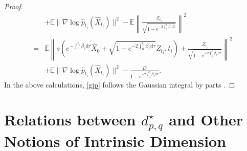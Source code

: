 \documentclass[12pts]{article}
\newcommand{\diff}{\mathrm{d}}
\newcommand{\hX}{ \widehat{X}}
\newcommand{\E}{\mathbb{E}}
\newcommand{\hp}{\hat{p}}
\begin{document}
\begin{proof}
\begin{align}
     & + \E\| \nabla \log \hp_{t_i}(\hX_{t_i})\|^2 - \E \left\| \frac{Z_{t_i}}{\sqrt{1-e^{-2 \int_0^{t_i} \beta_\tau \diff  \tau}}}  \right\|^2 \nonumber\\
     = & \E \left\| s\left(e^{-\int_0^{t_i} \beta_\tau \diff  \tau } \hX_0 + \sqrt{1-e^{- 2\int_0^{t_i} \beta_\tau \diff  \tau}} Z_{t_i} , t_i\right) + \frac{Z_{t_i}}{\sqrt{1-e^{- 2\int_0^{t_i} \beta_\tau \diff  \tau}}}  \right\|^2 \nonumber\\
     & + \E\| \nabla \log \hp_{t_i}(\hX_{t_i})\|^2 - \frac{D}{1-e^{- 2\int_0^{t_i} \beta_\tau \diff  \tau}}  . \nonumber
\end{align}
\endgroup
In the above calculations, \eqref{gip} follows the Gaussian integral by parts \citep[Lemma 7.2.4]{Vershynin_2026}.
\end{proof}
\section{Relations between $d^\star_{p,q}$ and Other Notions of Intrinsic Dimension}
\propone*
\end{document}
